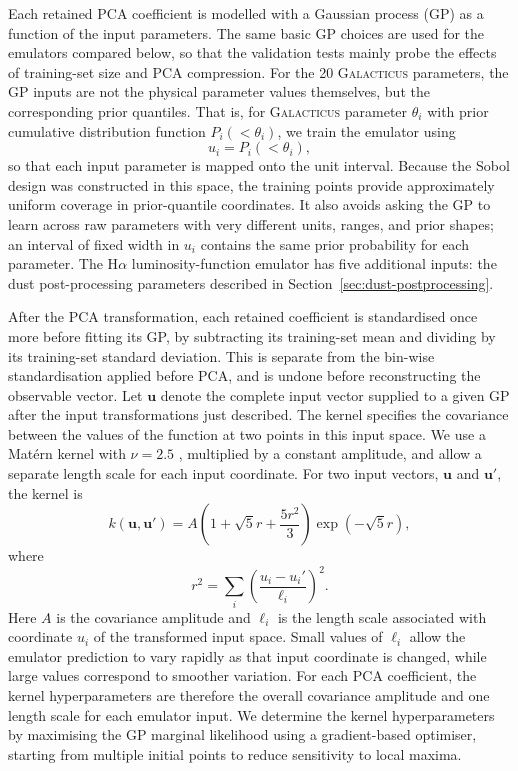 \documentclass[twocolumn, apj, numberedappendix, iop]{openjournal}
\newcommand{\galacticus}{\textsc{Galacticus}\xspace}
\newcommand{\ha}{H$\alpha$}
\begin{document}
Each retained PCA coefficient is modelled with a Gaussian process (GP) as a function of the input parameters.
The same basic GP choices are used for the emulators compared below, so that the validation tests mainly probe the effects of training-set size and PCA compression.
For the 20 \galacticus{} parameters, the GP inputs are not the physical parameter values themselves, but the corresponding prior quantiles.
That is, for \galacticus{} parameter $\theta_i$ with prior cumulative distribution function $P_i(<\theta_i)$, we train the emulator using
\begin{equation}
  u_i = P_i(<\theta_i),
\end{equation}
so that each input parameter is mapped onto the unit interval.
Because the Sobol design was constructed in this space, the training points
provide approximately uniform coverage in prior-quantile coordinates.
It also avoids asking the GP to learn across raw parameters with very different units, ranges, and prior shapes; an interval of fixed width in $u_i$ contains the same prior probability for each parameter.
The \ha{} luminosity-function emulator has five additional inputs: the dust post-processing parameters described in Section~\ref{sec:dust-postprocessing}.


After the PCA transformation, each retained coefficient is standardised once more before fitting its GP, by subtracting its training-set mean and dividing by its training-set standard deviation.
This is separate from the bin-wise standardisation applied before PCA, and is undone before reconstructing the observable vector.
Let $\mathbf{u}$ denote the complete input vector supplied to a given GP after the input transformations just described.
The kernel specifies the covariance between the values of the function at two points in this input space.
We use a Mat\'ern kernel with $\nu=2.5$ \citep[e.g.][]{2006gpml.book.....R},
multiplied by a constant amplitude, and allow a separate length scale for each
input coordinate.
For two input vectors, $\mathbf{u}$ and $\mathbf{u}'$, the kernel is
\begin{equation}
  k(\mathbf{u},\mathbf{u}')
  =
  A
  \left(1+\sqrt{5}r+\frac{5r^2}{3}\right)
  \exp\left(-\sqrt{5}r\right),
\end{equation}
where
\begin{equation}
  r^2 = \sum_i \left(\frac{u_i-u_i'}{\ell_i}\right)^2.
\end{equation}
Here $A$ is the covariance amplitude and $\ell_i$ is the length scale associated with coordinate $u_i$ of the transformed input space.
Small values of $\ell_i$ allow the emulator prediction to vary rapidly as that input coordinate is changed, while large values correspond to smoother variation.
For each PCA coefficient, the kernel hyperparameters are therefore the overall covariance amplitude and one length scale for each emulator input.
We determine the kernel hyperparameters by maximising the GP marginal
likelihood \citep{2006gpml.book.....R} using a gradient-based optimiser, starting from multiple initial points to reduce sensitivity to local maxima.
\end{document}
